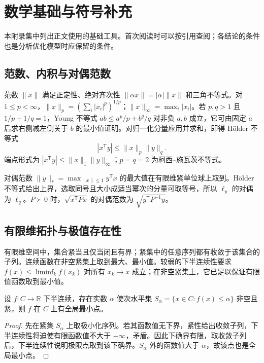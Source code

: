 \setcounter{chapter}{0} %
\chapter{数学基础与符号补充}
\label{app:co-background}

本附录集中列出正文使用的基础工具。首次阅读时可以按引用查阅；各结论的条件也是分析优化模型时应保留的条件。

\section{范数、内积与对偶范数}

范数 $\|x\|$ 满足正定性、绝对齐次性 $\|\alpha x\|=|\alpha|\|x\|$ 和三角不等式。对 $1\leq p<\infty$，$\|x\|_p=(\sum_i|x_i|^p)^{1/p}$；$\|x\|_\infty=\max_i|x_i|$。若 $p,q>1$ 且 $1/p+1/q=1$，Young 不等式 $ab\leq a^p/p+b^q/q$ 对非负 $a,b$ 成立，它可由固定 $a$ 后求右侧减左侧关于 $b$ 的最小值证明。对归一化分量应用并求和，即得 Hölder 不等式
\[
 |x^{\mathsf T}y|\leq\|x\|_p\|y\|_q.
\]
端点形式为 $|x^{\mathsf T}y|\leq\|x\|_1\|y\|_\infty$；$p=q=2$ 为柯西--施瓦茨不等式。

对偶范数 $\|y\|_*=\max_{\|x\|\leq1}y^{\mathsf T}x$ 的最大值在有限维紧单位球上取到。Hölder 不等式给出上界，选取同号且大小成适当幂次的分量可取等号，所以 $\ell_p$ 的对偶为 $\ell_q$。$P\succ0$ 时，$\sqrt{x^{\mathsf T}Px}$ 的对偶范数为 $\sqrt{y^{\mathsf T}P^{-1}y}$。

\section{有限维拓扑与极值存在性}

有限维空间中，集合紧当且仅当闭且有界；紧集中的任意序列都有收敛于该集合的子列。连续函数在非空紧集上取到最大、最小值。较弱的下半连续性要求 $f(x)\leq\liminf_k f(x_k)$ 对所有 $x_k\to x$ 成立；在非空紧集上，它已足以保证有限值函数取到最小值。

\begin{proposition}
设 $f:C\to\mathbb R$ 下半连续，存在实数 $\alpha$ 使次水平集 $S_\alpha=\{x\in C:f(x)\leq\alpha\}$ 非空且紧，则 $f$ 在 $C$ 上有全局最小点。
\end{proposition}
\begin{proof}
先在紧集 $S_\alpha$ 上取极小化序列。若其函数值无下界，紧性给出收敛子列，下半连续性将迫使有限函数值不大于 $-\infty$，矛盾。因此下确界有限，取收敛子列后，下半连续性说明极限点取到该下确界。$S_\alpha$ 外的函数值大于 $\alpha$，故该点也是全局最小点。
\end{proof}

